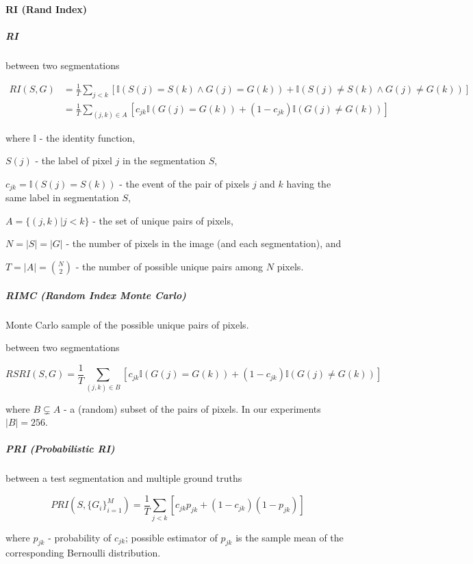 \paragraph{RI (Rand Index)}


\subparagraph*{RI}

between two segmentations

\begin{align*}
RI(S,G) & =\frac{1}{T}\sum\limits _{j<k}\left[\mathbb{I}\left(S(j)=S(k)\wedge G(j)=G(k)\right)+\mathbb{I}\left(S(j)\neq S(k)\wedge G(j)\neq G(k)\right)\right]\\
 & =\frac{1}{T}\sum\limits _{(j,k)\in A}\left[c_{jk}\mathbb{I}\left(G(j)=G(k)\right)+(1-c_{jk})\mathbb{I}\left(G(j)\neq G(k)\right)\right]
\end{align*}


where $\mathbb{I}$ - the identity function,

$S(j)$ - the label of pixel $j$ in the segmentation $S$,

$c_{jk}=\mathbb{I}\left(S(j)=S(k)\right)$ - the event of the pair
of pixels $j$ and $k$ having the same label in segmentation $S$,

$A=\{(j,k)|j<k\}$ - the set of unique pairs of pixels,

$N=\left|S\right|=\left|G\right|$ - the number of pixels in the image
(and each segmentation), and 

$T=|A|=\binom{N}{2}$ - the number of possible unique pairs among
$N$ pixels.


\subparagraph*{RIMC (Random Index Monte Carlo)} %
\label{RIMC-maths}
Monte Carlo sample of the possible unique pairs of pixels.

between two segmentations

\[
RSRI(S,G)=\frac{1}{T}\sum\limits _{(j,k)\in B}\left[c_{jk}\mathbb{I}\left(G(j)=G(k)\right)+(1-c_{jk})\mathbb{I}\left(G(j)\neq G(k)\right)\right]
\]


where $B\subsetneq A$ - a (random) subset of the pairs of pixels.
In our experiments $|B|=256$.


\subparagraph*{PRI (Probabilistic RI)}

between a test segmentation and multiple ground truths

\[
PRI(S,\{G_{i}\}_{i=1}^{M})=\frac{1}{T}\sum\limits _{j<k}\left[c_{jk}p_{jk}+\left(1-c_{jk}\right)\left(1-p_{jk}\right)\right]
\]


where $p_{jk}$ - probability of $c_{jk}$; possible estimator of
$p_{jk}$ is the sample mean of the corresponding Bernoulli distribution.


